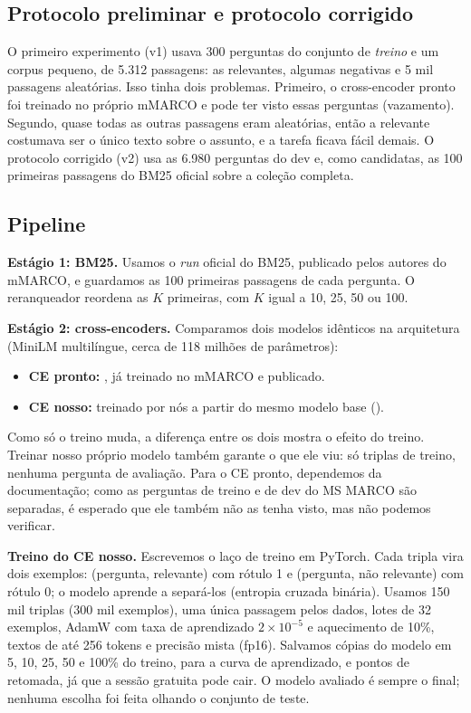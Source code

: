 \documentclass[12pt]{article}
\begin{document}
\subsection{Protocolo preliminar e protocolo corrigido}

O primeiro experimento (v1) usava 300 perguntas do conjunto de \emph{treino} e um corpus
pequeno, de 5.312 passagens: as relevantes, algumas negativas e 5 mil passagens aleatórias.
Isso tinha dois problemas. Primeiro, o cross-encoder pronto foi treinado no próprio mMARCO e
pode ter visto essas perguntas (vazamento). Segundo, quase todas as outras passagens eram
aleatórias, então a relevante costumava ser o único texto sobre o assunto, e a tarefa ficava
fácil demais. O protocolo corrigido (v2) usa as 6.980 perguntas do dev e, como candidatas, as
100 primeiras passagens do BM25 oficial sobre a coleção completa.

\subsection{Pipeline}

\textbf{Estágio 1: BM25.} Usamos o \textit{run} oficial do BM25, publicado pelos autores
do mMARCO, e guardamos as 100 primeiras passagens de cada pergunta. O reranqueador reordena as
$K$ primeiras, com $K$ igual a 10, 25, 50 ou 100.

\textbf{Estágio 2: cross-encoders.} Comparamos dois modelos idênticos na arquitetura
(MiniLM multilíngue, cerca de 118 milhões de parâmetros):
\begin{itemize}
  \item \textbf{CE pronto:} , já treinado no
  mMARCO e publicado.
  \item \textbf{CE nosso:} treinado por nós a partir do mesmo modelo base
  ().
\end{itemize}
Como só o treino muda, a diferença entre os dois mostra o efeito do treino. Treinar nosso
próprio modelo também garante o que ele viu: só triplas de treino, nenhuma pergunta de
avaliação. Para o CE pronto, dependemos da documentação; como as perguntas de treino e de dev
do MS MARCO são separadas, é esperado que ele também não as tenha visto, mas não podemos
verificar.

\textbf{Treino do CE nosso.} Escrevemos o laço de treino em PyTorch. Cada tripla vira dois
exemplos: (pergunta, relevante) com rótulo 1 e (pergunta, não relevante) com rótulo 0; o
modelo aprende a separá-los (entropia cruzada binária). Usamos 150 mil triplas (300 mil
exemplos), uma única passagem pelos dados, lotes de 32 exemplos, AdamW com taxa de
aprendizado $2\times10^{-5}$ e aquecimento de 10\%, textos de até 256 tokens e precisão mista
(fp16). Salvamos cópias do modelo em 5, 10, 25, 50 e 100\% do treino, para a curva de
aprendizado, e pontos de retomada, já que a sessão gratuita pode cair. O modelo avaliado é
sempre o final; nenhuma escolha foi feita olhando o conjunto de teste.
\end{document}
